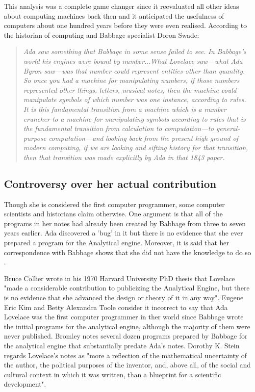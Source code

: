 \documentclass{article}
\begin{document}
This analysis was a complete game changer since it reevaluated all other ideas about computing machines back then and it anticipated the usefulness of computers about one hundred years before they were even realised. According to the historian of computing and Babbage specialist Doron Swade:
\begin{quote}
    \textit{
        Ada saw something that Babbage in some sense failed to see. In Babbage's world his engines were bound by number...What Lovelace saw—what Ada Byron saw—was that number could represent entities other than quantity. So once you had a machine for manipulating numbers, if those numbers represented other things, letters, musical notes, then the machine could manipulate symbols of which number was one instance, according to rules. It is this fundamental transition from a machine which is a number cruncher to a machine for manipulating symbols according to rules that is the fundamental transition from calculation to computation—to general-purpose computation—and looking back from the present high ground of modern computing, if we are looking and sifting history for that transition, then that transition was made explicitly by Ada in that 1843 paper.
    }
\end{quote}

\newpage

\subsection{Controversy over her actual contribution}

Though she is considered the first computer programmer, some computer scientists and historians claim otherwise. One argument is that all of the programs in her notes had already been created by Babbage from three to seven years earlier. Ada discovered a 'bug' \cite{Bug} in it but there is no evidence that she ever prepared a program for the Analytical engine. Moreover, it is said that her correspondence with Babbage shows that she did not have the knowledge to do so \cite{AllanBromley}.

\vspace{0.3cm}

Bruce Collier wrote in his 1970 Harvard University PhD thesis that Lovelace "made a considerable contribution to publicizing the Analytical Engine, but there is no evidence that she advanced the design or theory of it in any way". Eugene Eric Kim and Betty Alexandra Toole consider it incorrect to say that Ada Lovelace was the first computer programmer in ther world since Babbage wrote the initial programs for the analytical engine, although the majority of them were never published. Bromley notes several dozen programs prepared by Babbage for the analytical engine that substantially predate Ada's notes.  Dorothy K. Stein regards Lovelace's notes as "more a reflection of the mathematical uncertainty of the author, the political purposes of the inventor, and, above all, of the social and cultural context in which it was written, than a blueprint for a scientific development".
\end{document}
